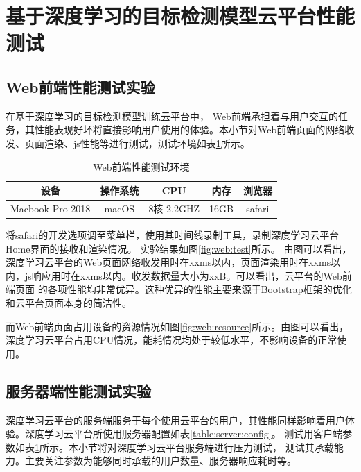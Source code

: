 \section{基于深度学习的目标检测模型云平台性能测试}
 
\subsection{Web前端性能测试实验}  
 
在基于深度学习的目标检测模型训练云平台中，
Web前端承担着与用户交互的任务，其性能表现好坏将直接影响用户使用的体验。本小节对Web前端页面的网络收发、页面渲染、js性能等进行测试，测试环境如表\ref{table:Web:env}所示。

{
    \begin{table}[htb]   
        \caption{Web前端性能测试环境}
        \label{table:Web:env}
        \centering
        \begin{tabular}[t]{ccccc}
            \hline
            设备 & 操作系统 & CPU & 内存 & 浏览器\\
            \hline
            Macbook Pro 2018 & macOS & 8核 2.2GHZ & 16GB & safari \\
            \hline
        \end{tabular}
    \end{table}
}

将safari的开发选项调至菜单栏，使用其时间线录制工具，录制深度学习云平台Home界面的接收和渲染情况。
实验结果如图\ref{fig:web:test}所示。
由图可以看出，深度学习云平台的Web页面网络收发用时在xxms以内，页面渲染用时在xxms以内，js响应用时在xxms以内。收发数据量大小为xxB。可以看出，云平台的Web前端页面
的各项性能均非常优异。这种优异的性能主要来源于Bootstrap框架的优化和云平台页面本身的简洁性。


而Web前端页面占用设备的资源情况如图\ref{fig:web:resource}所示。由图可以看出，深度学习云平台占用CPU情况，能耗情况均处于较低水平，不影响设备的正常使用。


\subsection{服务器端性能测试实验}

深度学习云平台的服务端服务于每个使用云平台的用户，其性能同样影响着用户体验。深度学习云平台所使用服务器配置如表\ref{table:server:config}。
测试用客户端参数如表\ref{table:Web:env}所示。本小节将对深度学习云平台服务端进行压力测试，
测试其承载能力。主要关注参数为能够同时承载的用户数量、服务器响应耗时等。

